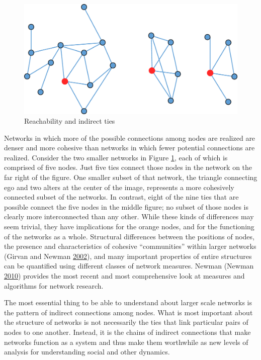 \documentclass[]{krantz}
\begin{document}
\begin{figure}

{\centering \includegraphics[width=0.7\linewidth]{ChapterNetworks/figures/fig8-4} 

}

\caption{Reachability and indirect ties}\label{fig:fig8-4}
\end{figure}

Networks in which more of the possible connections among nodes are
realized are denser and more cohesive than networks in which fewer
potential connections are realized. Consider the two smaller networks in
Figure \ref{fig:fig8-4}, each of which is comprised of five nodes. Just
five ties connect those nodes in the network on the far right of the
figure. One smaller subset of that network, the triangle connecting ego
and two alters at the center of the image, represents a more cohesively
connected subset of the networks. In contrast, eight of the nine ties
that are possible connect the five nodes in the middle figure; no subset
of those nodes is clearly more interconnected than any other. While
these kinds of differences may seem trivial, they have implications for
the orange nodes, and for the functioning of the networks as a whole.
Structural differences between the positions of nodes, the presence and
characteristics of cohesive ``communities'' within larger networks
(Girvan and Newman \protect\hyperlink{ref-girvan2002community}{2002}),
and many important properties of entire structures can be quantified
using different classes of network measures. Newman (Newman
\protect\hyperlink{ref-newman2010networks}{2010}) provides the most
recent and most comprehensive look at measures and algorithms for
network research.

The most essential thing to be able to understand about larger scale
networks is the pattern of indirect connections among nodes. What is
most important about the structure of networks is not necessarily the
ties that link particular pairs of nodes to one another. Instead, it is
the chains of indirect connections that make networks function as a
system and thus make them worthwhile as new levels of analysis for
understanding social and other dynamics.
\end{document}
